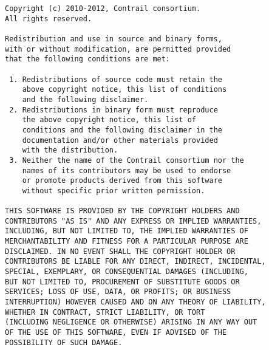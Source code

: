 \documentclass[10pt]{article}
\begin{document}
\begin{verbatim}
Copyright (c) 2010-2012, Contrail consortium.
All rights reserved.

Redistribution and use in source and binary forms, 
with or without modification, are permitted provided
that the following conditions are met:

 1. Redistributions of source code must retain the
    above copyright notice, this list of conditions
    and the following disclaimer.
 2. Redistributions in binary form must reproduce
    the above copyright notice, this list of 
    conditions and the following disclaimer in the
    documentation and/or other materials provided
    with the distribution.
 3. Neither the name of the Contrail consortium nor the
    names of its contributors may be used to endorse
    or promote products derived from this software 
    without specific prior written permission.

THIS SOFTWARE IS PROVIDED BY THE COPYRIGHT HOLDERS AND
CONTRIBUTORS "AS IS" AND ANY EXPRESS OR IMPLIED WARRANTIES,
INCLUDING, BUT NOT LIMITED TO, THE IMPLIED WARRANTIES OF
MERCHANTABILITY AND FITNESS FOR A PARTICULAR PURPOSE ARE
DISCLAIMED. IN NO EVENT SHALL THE COPYRIGHT HOLDER OR
CONTRIBUTORS BE LIABLE FOR ANY DIRECT, INDIRECT, INCIDENTAL,
SPECIAL, EXEMPLARY, OR CONSEQUENTIAL DAMAGES (INCLUDING, 
BUT NOT LIMITED TO, PROCUREMENT OF SUBSTITUTE GOODS OR 
SERVICES; LOSS OF USE, DATA, OR PROFITS; OR BUSINESS 
INTERRUPTION) HOWEVER CAUSED AND ON ANY THEORY OF LIABILITY,
WHETHER IN CONTRACT, STRICT LIABILITY, OR TORT
(INCLUDING NEGLIGENCE OR OTHERWISE) ARISING IN ANY WAY OUT
OF THE USE OF THIS SOFTWARE, EVEN IF ADVISED OF THE
POSSIBILITY OF SUCH DAMAGE.
\end{verbatim}
\end{document}
